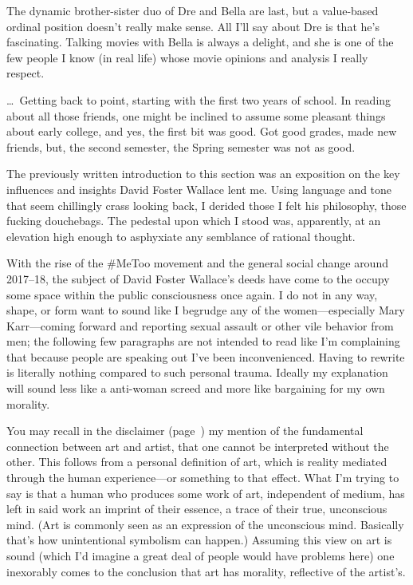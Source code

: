 \documentclass[./butidigress.tex]{subfiles}
\begin{document}
The dynamic brother-sister duo of Dre and Bella are last, but a value-based ordinal position doesn't really make sense.
All I'll say about Dre is that he's fascinating.
Talking movies with Bella is always a delight, and she is one of the few people I know (in real life) whose movie opinions and analysis I really respect.

\entryskip

\ldots\ Getting back to point, starting with the first two years of school.
In reading about all those friends, one might be inclined to assume some pleasant things about early college, and yes, the first bit was good.
Got good grades, made new friends, but, the second semester, the Spring semester was not as good.


\label{sec:influences}
The previously written introduction to this section was an exposition on the key influences and insights David Foster Wallace lent me.
Using language and tone that seem chillingly crass looking back, I derided those I felt  his philosophy, those fucking douchebags.
The pedestal upon which I stood was, apparently, at an elevation high enough to asphyxiate any semblance of rational thought.

With the rise of the \#MeToo movement and the general social change around 2017--18, the subject of David Foster Wallace's deeds have come to the occupy some space within the public consciousness once again.
I do not in any way, shape, or form want to sound like I begrudge any of the women---especially Mary Karr---coming forward and reporting sexual assault or other vile behavior from men; the following few paragraphs are not intended to read like I'm complaining that because people are speaking out I've been inconvenienced.
Having to rewrite is literally nothing compared to such personal trauma.
Ideally my explanation will sound less like a anti-woman screed and more like bargaining for my own morality.

You may recall in the disclaimer (page~\pageref{chap:disclaimer}) my mention of the fundamental connection between art and artist, that one cannot be interpreted without the other.
This follows from a personal definition of art, which is reality mediated through the human experience---or something to that effect.
What I'm trying to say is that a human who produces some work of art, independent of medium, has left in said work an imprint of their essence, a trace of their true, unconscious mind.
(Art is commonly seen as an expression of the unconscious mind.
Basically that's how unintentional symbolism can happen.)
Assuming this view on art is sound (which I'd imagine a great deal of people would have problems here) one inexorably comes to the conclusion that art has morality, reflective of the artist's.
\end{document}
